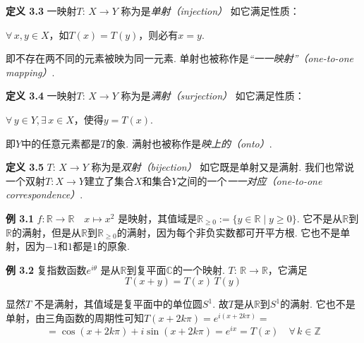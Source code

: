 \documentclass{article}
\begin{document}
\vspace{4pt}

\textbf{定义 3.3} 一映射$T:\,X\longrightarrow Y$ 称为是\textit{单射（injection）} 如它满足性质：

\vspace{3pt}

\qquad $\forall\,x,y\in X$，如$T(x)=T(y)$，则必有$x=y$.

\vspace{3pt}

即不存在两不同的元素被映为同一元素. 单射也被称作是\textit{“一一映射”（one-to-one mapping）}. 

\vspace{3pt}

\textbf{定义 3.4} 一映射$T:\,X\longrightarrow Y$ 称为是\textit{满射（surjection）} 如它满足性质：

\vspace{3pt}

\qquad $\forall\,y\in Y$,\,$\exists\,x\in 
 X$，使得$y=T(x)$. 

 \vspace{3pt}

 即$Y$中的任意元素都是$T$的象. 满射也被称作是\textit{映上的（onto）}.

\vspace{3pt}

\textbf{定义 3.5} $T:\,X\longrightarrow Y$ 称为是\textit{双射（bijection）} 如它既是单射又是满射. 我们也常说一个双射$T:X\longrightarrow Y$建立了集合$X$和集合$Y$之间的一个\textit{一一对应（one-to-one correspondence）}.

\vspace{3pt}


\textbf{例 3.1} $f: \mathbb{R}\longrightarrow \mathbb{R}\quad x\longmapsto x^{2}$ 是映射，其值域是$\mathbb{R}_{\geq 0}:=\{y\in \mathbb{R}\mid y\geq 0\}$. 它不是从$\mathbb{R}$到$\mathbb{R}$的满射，但是从$\mathbb{R}$到$\mathbb{R}_{\geq 0}$的满射，因为每个非负实数都可开平方根. 它也不是单射，因为$-1$和$1$都是$1$的原象. 

\vspace{4pt}

\textbf{例 3.2} 复指数函数$e^{i\theta}$ 是从$\mathbb{R}$到复平面$\mathbb{C}$的一个映射. $T:\,\mathbb{R}\longrightarrow\mathbb{R}$，它满足\[T(x+y)=T(x)\,T(y)\]

显然$T$ 不是满射，其值域是复平面中的单位圆$S^{1}$. 故$T$是从$\mathbb{R}$到$S^{1}$的满射. 它也不是单射，由三角函数的周期性可知$T(x+2k\pi)=e^{i(x+2k\pi)}=$\[=\cos{(x+2k\pi)}+i\sin{(x+2k\pi)}=e^{ix}=T(x)\quad \forall\,k\in\mathbb{Z}\]
\end{document}
